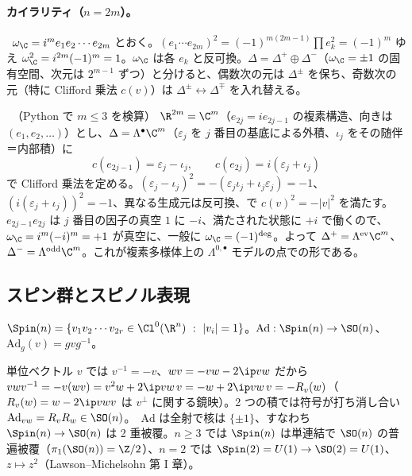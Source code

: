\paragraph{カイラリティ（$n=2m$）。}\tP\ $\omega_{\C}=i^m e_1e_2\cdots e_{2m}$ とおく。$(e_1\cdots e_{2m})^2=(-1)^{m(2m-1)}\prod e_k^2=(-1)^m$ ゆえ $\omega_{\C}^2=i^{2m}(-1)^m=1$。$\omega_{\C}$ は各 $e_k$ と反可換。$\Delta=\Delta^+\oplus\Delta^-$（$\omega_{\C}=\pm1$ の固有空間、次元は $2^{m-1}$ ずつ）と分けると、偶数次の元は $\Delta^\pm$ を保ち、奇数次の元（特に Clifford 乗法 $c(v)$）は $\Delta^\pm\leftrightarrow\Delta^\mp$ を入れ替える。

\begin{ex}\label{ex:Fock}\tP\ （Python で $m\le3$ を検算）
$\R^{2m}=\C^m$（$e_{2j}=ie_{2j-1}$ の複素構造、向きは $(e_1,e_2,\dots)$）とし、$\Delta=\Lambda^\bullet\C^m$（$\varepsilon_j$ を $j$ 番目の基底による外積、$\iota_j$ をその随伴＝内部積）に
\[
c(e_{2j-1})=\varepsilon_j-\iota_j,\qquad c(e_{2j})=i(\varepsilon_j+\iota_j)
\]
で Clifford 乗法を定める。$(\varepsilon_j-\iota_j)^2=-(\varepsilon_j\iota_j+\iota_j\varepsilon_j)=-1$、$(i(\varepsilon_j+\iota_j))^2=-1$、異なる生成元は反可換、で $c(v)^2=-|v|^2$ を満たす。$e_{2j-1}e_{2j}$ は $j$ 番目の因子の真空 $1$ に $-i$、満たされた状態に $+i$ で働くので、$\omega_{\C}=i^m(-i)^m=+1$ が真空に、一般に $\omega_{\C}=(-1)^{\deg}$。よって $\Delta^+=\Lambda^{\rm ev}\C^m$、$\Delta^-=\Lambda^{\rm odd}\C^m$。これが複素多様体上の $\Lambda^{0,\bullet}$ モデルの点での形である。
\end{ex}

\subsection{スピン群とスピノル表現}
\begin{defn}[スピン群]\label{def:Spin}
$\Spin(n)=\{v_1v_2\cdots v_{2r}\in\Cl^0(\R^n)\ :\ |v_i|=1\}$。$\mathrm{Ad}:\Spin(n)\to\SO(n)$、$\mathrm{Ad}_g(v)=gvg^{-1}$。
\end{defn}
単位ベクトル $v$ では $v^{-1}=-v$、$wv=-vw-2\ip vw$ だから $vwv^{-1}=-v(wv)=v^2w+2\ip vw\,v=-w+2\ip vw\,v=-R_v(w)$（$R_v(w)=w-2\ip vwv$ は $v^\perp$ に関する鏡映）。2 つの積では符号が打ち消し合い $\mathrm{Ad}_{vw}=R_vR_w\in\SO(n)$。\tC\ $\mathrm{Ad}$ は全射で核は $\{\pm1\}$、すなわち $\Spin(n)\to\SO(n)$ は 2 重被覆。$n\ge3$ では $\Spin(n)$ は単連結で $\SO(n)$ の普遍被覆（$\pi_1(\SO(n))=\Z/2$）、$n=2$ では $\Spin(2)=U(1)\to\SO(2)=U(1)$、$z\mapsto z^2$（Lawson--Michelsohn 第 I 章）。

